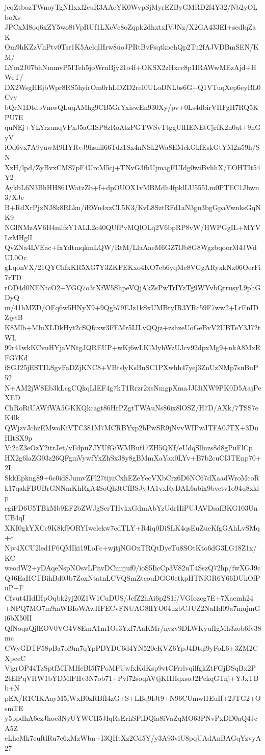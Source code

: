 jeqZtbozTWnoyTgNHxxl2cuR3AAeYK0WvpSjMyrEZByGMRD2f4Y32/Nb2yOLboXs
JPCxM8oq6xZY5wo8tVpRUf1LXeVc8oZqpk2dhxtxIVJNz/X2GA433EI+sedlqZaK
Om9hKZzVhPtv0Tsr1K5AclqlHrw8uoJPRtBvFsqtkoehQp2Tu2fAJVDBmSEN/KM/
LYm2J07bhNmmvP5ITeh5joWrnBjy21o4f+OKSX2zHxcc8p1IRAWwMEzAjd+HWeT/
DX2WsgHEjbWpr8RS5hyirOm0rhLDZD2reI0ULoDNLbs6G+Q1VTuqXep6eyBL0Cvy
bQrN1DtdbVmwQLuqAMhg9CB5GrYxiswEn930Xy/pv+0Ls4dbirVHFgH7RQ5KPU7E
quNEj+YLYrzunqVPxJ5aGISP8zRoAtzPGTWSvTtggUlHENEtCjrfK2n0at+9hGyV
iOd6vx7A9yuwM9HYRvJ9hsnil66Tdz1Sx4nNSk2Wa8EMckGkfEskGtYM2n59h/SN
XzH/lpd/ZyBvxCMS7pF4UrcM5cj+TNvG3fhUjmagFUIdg0wiBvhhX/EOHTIt54Y2
AykbL6N3BhHH861WatzZb+f+dpOUOX1vMBMdh4fpklLU555Lm0PTEC1Jbwn3/XJe
B+RdXrPjxNJ8k8RLkn/iRWn4xzCL5K3/KvL8SztRFd1aN3gu3bgGpaVwnksGqNK9
NGlNMzAV6H4mlfzY1ALL2o40QUfPvMQlOLq2V6bpRP8vW/HWPGgIL+MYVLzMHglI
QvZNa4LVEac+fxYdtmqkmLQW/RtM/LlaAaeM6GZ7lJb8G8WgzbqoorM4JWdUL0Oc
gLqonVX/21QYChfxKR5XG7Y3ZKFEKxo4KO7cb6yqMc8VGgARyxkNx06OerFi7rTD
rOD4d0NENtcO2+YGQ7o3tXfW5ShpeVQjAkZsPwTrIYzTg9WYvbQrrusyL9phGDyQ
m/41hMZD/OFq6w5HNyX9+9Qgb79EJz1kSxUMBryIR3YRc59F7ww2+LrEnIDZjytB
K8Mlb+MluXLDkHyt2cSQfcxw3FEMr5IJLvQQjz+zshzeUoGeBvV2UBTeY3J72tWL
99r41wkKCvuHYjaVNtgJQREUP+wKj6wLKlMyhWzUJcv92dpxMg9+nkA8MxRFG7Kd
fSGJ25jESTILSgvFaDZjKNC8+VBtslyKsBnSC1PXwhh47yej3ZnUzNMp7suBuP52
N+AM2jW8Eb3kLcgCQkqLIEF4g7kT1Rrzr2xsNmgpXmaJJI3iXW9PK0D5AajPeXED
ChRoRiUAWfWA5GKKQkcagt86HrPZgtTWAuNs86ix8lOSZ/H7D/AXk/7TSS7eK4lk
QWjzvJchzEMwoKiVTC381M7MCRBYxp2bPwSR9jNvvWIPwJTFA0JTX+3DuHItSX9p
Vi2aZ3eOzY2itrJet/vFdpuZJYUfGiWMBuf17ZH5QKf/eUdqSllnzs8d8gPuFlCp
HX2g6laZG93z26QFgmVywfYxZhSx38y8gBMmXaYax0LYv+B7b2cuCI3TEnp70+2L
SkkEpkng89+6c0id8JumvZFl27tijuCxhEZeYecVXbCrz6D6NC67dXaadWroMcoR
k17qakFBUBrGNNmKhRgA4SoQh3tCfBSJyJA1vxRyDAL6abix9bvctv1o94u8xklp
cgiFD6U5TBkMb9EF2bZWJgSerTHvkxGdmAbYzUdrHiPUJAVDsafBKG103UnUB4qI
XKI0gkYXCc9K8kf9ORYIwclekw7cdTLY+R4iq0DiSLK4qsEuZueKfgGAhLvSMq+c
Njv4XCU2led1F6QMIki19LoFc+wjtjNGOxTRQtDyeTu8SOtKto6dG3LG18Z1x/KC
weodW2+yDAqeNspNOsvLPnvDCmrjuf0/ioS5IicCp3V82uT4SszQ72hp/fwXGJ9c
QJ6EaHCTBihBd0Jb7ZoxNtatnLCVQSmZtcouDGG0etkpHTNfGR6Y66DUkOfPuP+F
Cfvut4IIdIHpOqbk2yj20Z1W1CuDUS/JcfZ2hAi6p2S1f/VGIozcg7E+7Xaemh24
+NPQ7MO7m9mWBIoWAwHFECvFNUAG8lIYO04uzbCJUZ2NaHd09a7mujmGi6bX50II
QfNoqaQjlEOV0VG4V8EmA1m1Os3Yxf7AaKMr/nyzv9DLWKyufIgMh3zob6fv38mc
CWyGDTF58pBa7oi9m7qYpPDYDC6d4YN520eKVZ6YpJ4Dtqi9yFoL6+3ZM2CXpceC
VjgrOP44TzSptfMTMHeBI5f7PoMFUwfxKdKsp9vtCFrrlvqilfgkZtFGjDSqBx2P
2tElPqVHW1bYDMlFHv3N7ob71+Pvf72soqAVtjKHHqxsoJ2PckqGTnj+YJxTBb+N
pEX/R1CIKAayM5fWxB0zRBfI4zG+S+LBq9IJt9+N96CUmwl1EuIf+2JTG2+OsmTE
y5ppdhA6ezJhoc3NyUYWCH5JIqRsErhSPiDQia8iVaZqMO63PNvPxDD0aQ4JcA5Z
cLhcMk7euftlRu7c6xMzWbn+I3QHtXz2Cd5Y/y3A93viU8pqUAdAnBAGqYzvyA27

